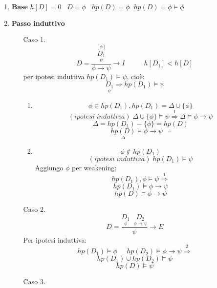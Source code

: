 \documentclass{article}
\theoremstyle{break}
\theoremstyle{break}
\theoremstyle{break}
\theoremstyle{break}
\begin{document}
\begin{enumerate}
    \item \textbf{Base} \( h[D]=0 \;\;\;D = \phi \;\;\; hp(D) =\phi \;\; hp(D)=\phi \models \phi \) 
    \item \textbf{Passo induttivo}
        \begin{enumerate}
            \item [Caso 1.]
            \[
                D = \frac{\stackrel{[\phi]}{\underset{\psi}{D_1}}}{\phi \to \psi} \to I \;\;\;
                \;\;\;\;\;\;\; h[D_1] < h[D]
            \]
            per ipotesi induttiva \( hp(D_1) \models \psi \), cioè:
            \[
                \underset{\psi}{D_1} \Rightarrow hp(D_1) \models \psi
            \] 
            \begin{enumerate}
                \item \[ \phi \in  hp(D_1), hp(D_1) = \Delta \cup \{\phi\}  \] 
                    \[
                        (ipotesi\;induttiva)\; \Delta \cup \{\phi\} \models \psi \stackrel{1}{\Rightarrow} \Delta \models \phi \to \psi 
                    \] 
                    \[
                    \Delta = hp(D_1) - \{\phi\} = hp(D)
                    \] 
                    \[
                        \underset{\Delta}{hp(D)} \models \phi \to \psi\;\;\; \square
                    \] 
                \item  \[
                \phi \not\in hp(D_1)
                \]  
                \[
                    (ipotesi\;induttiva)\; hp(D_1) \models \psi
                \] 
                Aggiungo \( \phi \) per weakening:
                \[
                    hp(D_1),\phi \models \psi \stackrel{1}{\Rightarrow}
                \] 
                \[ 
                hp(D_1) \models \phi \to \psi
                \] 
                \[
                hp(D) \models \phi \to \psi
                \] 
            \end{enumerate}
            \item [Caso 2.]
                \[
                    D= \frac{\underset{\phi}{D_1}\;\; \underset{\phi \to \psi}{D_2}}{\psi} \to E
                \] 
                Per ipotesi induttiva:
                \[
                hp(D_1) \models \phi\;\;\;\;\; hp(D_2) \models \phi \to \psi \stackrel{2}{\Rightarrow}
                \] 
                \[
                hp(D_1) \cup hp(D_2) \models \psi
                \] 
                \[
                hp(D) \models \psi
                \] 
              \item [Caso 3.] 

\end{enumerate}
\end{enumerate}
\end{document}
